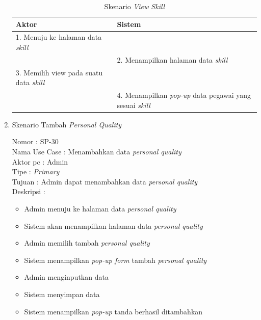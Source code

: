 \begin{enumerate}
\begin{itemize}
\end{itemize}

\begin{table}
	\caption{Skenario \textit{View Skill}}
	\centering
	\begin{tabular}{ | l | p{65mm}|}
		\hline 
		\textbf{Aktor} & \textbf{Sistem} \\
		\hline
		
		1.	Menuju ke halaman data \textit{skill} &  \\
		
		\hline
		
		&  2.	Menampilkan halaman data \textit{skill} \\
		
		\hline
		
		3. Memilih view pada suatu data \textit{skill} & \\
		
		\hline
		
		& 4.	Menampilkan \textit{pop-up} data pegawai yang sesuai \textit{skill} \\
		\hline
		
	\end{tabular}
\end{table}

\item Skenario Tambah \textit{Personal Quality}

Nomor \kern 3.6pc : SP-30 \\
Nama Use Case : Menambahkan data \textit{personal quality} \\
Aktor  pc : Admin \\
Tipe \kern 4.6pc : \textit{Primary} \\
Tujuan \kern 3.6pc : Admin dapat menambahkan data \textit{personal quality} \\
Deskripsi \kern 2.5pc : 

\begin{itemize}
	\item Admin menuju ke halaman data \textit{personal quality}
	\item Sistem akan menampilkan halaman data \textit{personal quality}
	\item Admin memilih tambah \textit{personal quality}
	\item Sistem menampilkan\textit{ pop-up form}  tambah \textit{personal quality}
	\item Admin menginputkan data
	\item Sistem menyimpan data
	\item Sistem menampilkan \textit{pop-up} tanda berhasil ditambahkan
	

\end{itemize}
\end{enumerate}
